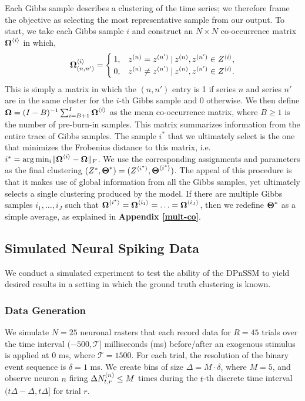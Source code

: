 \documentclass[twoside]{article}
\begin{document}
Each Gibbs sample describes a clustering of the time series; we therefore frame the objective as selecting the most representative sample from our output.  To start, we take each Gibbs sample $i$ and construct an $N \times N$ co-occurrence matrix $\baidx \Omega i$ in which, 
\begin{align}
\baidx [(n, n')] \Omega i =
\begin{cases}
1, & \idx z n = \idx z {n'} \given \idx z n, \idx z {n'} \in \aidx Z i,\\
0, & \idx z n \neq \idx z {n'} \given \idx z n, \idx z {n'} \in \aidx Z i.
\end{cases} \label{co-occurrence}
\end{align}
This is simply a matrix in which the $(n, n')$ entry is 1 if series $n$ and series $n'$ are in the same cluster for the $i$-th Gibbs sample and 0 otherwise.  {We then define {$\bd \Omega = (I-B)^{-1} \sum_{i=B+1}^I \baidx \Omega i$}} as the mean co-occurrence matrix, where $B \geq 1$ is the number of pre-burn-in samples.  This matrix summarizes information from the entire trace of Gibbs samples.  The sample $i^*$ that we ultimately select is the one that minimizes the Frobenius distance to this matrix, i.e. $i^* = \arg \min_{i} \norm{\baidx \Omega i - \bd \Omega}_F$.
We use the corresponding assignments and parameters as the final  clustering $(Z^*, \bd \Theta^*) = (\aidx Z {i^*}, \baidx \Theta {i^*})$.  The appeal of this procedure is that it makes use of global information from all the Gibbs samples, yet ultimately selects a single clustering produced by the model.  If there are multiple Gibbs samples $i_1, \ldots, i_J$ such that $\baidx \Omega {i^*} = \baidx \Omega {i_1} = \ldots = \baidx \Omega {i_J}$, then we redefine $\bd \Theta^*$ as a simple average, as explained in \textbf{Appendix \ref{mult-co}}.     

\subsection{Simulated Neural Spiking Data}
We conduct a simulated experiment to test the ability of the DPnSSM to yield desired results in a setting in which the ground truth clustering is known. 

\subsubsection{Data Generation} \label{sssec:sim-data}
We simulate $N = 25$ neuronal rasters that each record data for $R = 45$ trials over the time interval $(-500, \mathcal{T}]$ milliseconds (ms) before/after an exogenous stimulus is applied at 0 ms, where $\mathcal{T} = 1500$.  For each trial, the resolution of the binary event sequence is $\delta = 1$ ms.  We create bins of size  $\Delta =  M \cdot \delta$, where $M = 5$, and observe neuron $n$ firing $\Delta \idx[t, r] N n \leq M$ times during the $t$-th discrete time interval $(t\Delta - \Delta, t\Delta]$ for trial $r$.  
\end{document}
